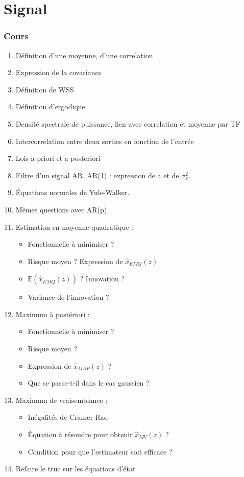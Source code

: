 \documentclass[11pt, twocolumn, landscape]{article}
\begin{document}

\part{Signal}
\section{Cours}
\begin{enumerate}
\item Définition d'une moyenne, d'une correlation
\item Expression de la covariance
\item Définition de WSS
\item Définition d'ergodique
\item Densité spectrale de puissance, lien avec correlation et moyenne par TF
\item Intercorrelation entre deux sorties en fonction de l'entrée
\item Lois a priori et a posteriori
\item Filtre d'un signal AR. AR(1) : expression de a et de $\sigma_x^2$.
\item Équations normales de Yule-Walker. 
\item Mêmes questions avec AR(p)
\item Estimation en moyenne quadratique :
	\begin{itemize}
		\item Fonctionnelle à minimiser ?  
		\item Risque moyen ? Expression de $\hat{x}_{EMQ}(z)$
		\item $\mathbb{E}(\hat{x}_{EMQ}(z))$ ? Innovation ?
		\item Variance de l'innovation ?
	\end{itemize}
\item Maximum à postériori : 
	\begin{itemize}
		\item Fonctionnelle à minimiser ?
		\item Risque moyen ?
		\item Expression de $\hat{x}_{MAP}(z)$ ?
		\item Que se passe-t-il dans le cas gaussien ?
	\end{itemize}
\item Maximum de vraisemblance :
	\begin{itemize}
		\item Inégalités de Cramer-Rao
		\item Équation à résoudre pour obtenir $\hat{x}_{MV}(z)$ ?
		\item Condition pour que l'estimateur soit efficace ?
	\end{itemize}
\item Refaire le truc sur les équations d'état
\end{enumerate}
\end{document}
